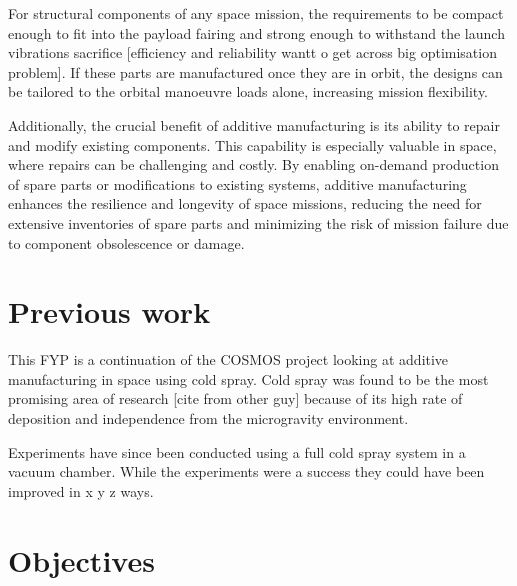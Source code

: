 For structural components of any space mission, the requirements to be compact enough to fit into the payload fairing and strong enough to withstand the launch vibrations sacrifice [efficiency and reliability wantt o get across big optimisation problem]. If these parts are manufactured once they are in orbit, the designs can be tailored to the orbital manoeuvre loads alone, increasing mission flexibility. 

Additionally, the crucial benefit of additive manufacturing is its ability to repair and modify existing components. This capability is especially valuable in space, where repairs can be challenging and costly. By enabling on-demand production of spare parts or modifications to existing systems, additive manufacturing enhances the resilience and longevity of space missions, reducing the need for extensive inventories of spare parts and minimizing the risk of mission failure due to component obsolescence or damage.
\section{Previous work}
This FYP is a continuation of the COSMOS project looking at additive manufacturing in space using cold spray. Cold spray was found to be the most promising area of research [cite from other guy] because of its high rate of deposition and independence from the microgravity environment.

Experiments have since been conducted using a full cold spray system in a vacuum chamber. While the experiments were a success they could have been improved in x y z ways.

\newpage

\section{Objectives}

